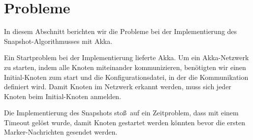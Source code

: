 \section{Probleme}
\label{sec:probs}
In diesem Abschnitt berichten wir die Probleme bei der Implementierung des
Snapshot-Algorithmusses mit Akka.

Ein Startproblem bei der Implementierung lieferte Akka.
Um ein Akka-Netzwerk zu starten, indem alle Knoten miteinander kommunizieren,
benötigten wir einen Initial-Knoten zum start und die Konfigurationsdatei, in
der die Kommunikation definiert wird.
Damit Knoten im Netzwerk erkannt werden, muss sich jeder Knoten beim
Initial-Knoten anmelden.

Die Implementierung des Snapshots stoß auf ein Zeitproblem, dass mit einem
Timeout gelöst wurde, damit Knoten gestartet werden könnten bevor die ersten
Marker-Nachrichten gesendet werden.
